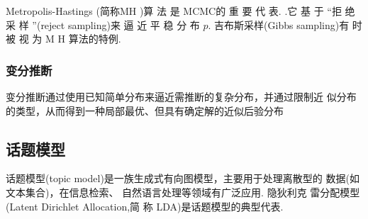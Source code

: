 Metropolis-Hastings (简称MH )算 法 是 MCMC的 重 要 代 表. .它 基 于 “拒
绝 采 样 ”(reject sampling)来 逼 近 平 稳 分 布 $p$. 吉布斯采样(Gibbs sampling)有 时 被 视 为 M H 算法的特例. 


\subsubsection{变分推断}
变分推断通过使用已知简单分布来逼近需推断的复杂分布，并通过限制近
似分布的类型，从而得到一种局部最优、但具有确定解的近似后验分布


\subsection{话题模型}
话题模型(topic model)是一族生成式有向图模型，主要用于处理离散型的
数据(如文本集合)，在信息检索、 自然语言处理等领域有广泛应用. 隐狄利克
雷分配模型(Latent Dirichlet Allocation,简 称 LDA)是话题模型的典型代表.